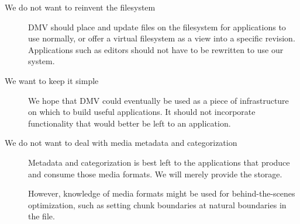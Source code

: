 \begin{description}

    \item[We do not want to reinvent the filesystem] DMV should place and update
        files on the filesystem for applications to use normally, or offer a
        virtual filesystem as a view into a specific revision. Applications such
        as editors should not have to be rewritten to use our system.

  \item[We want to keep it simple] We hope that DMV could eventually be used as
      a piece of infrastructure on which to build useful applications. It should
      not incorporate functionality that would better be left to an application.

  \item[We do not want to deal with media metadata and categorization] Metadata
      and categorization is best left to the applications that produce and
      consume those media formats. We will merely provide the storage.

      However, knowledge of media formats might be used for behind-the-scenes
      optimization, such as setting chunk boundaries at natural boundaries in
      the file.

\end{description}
